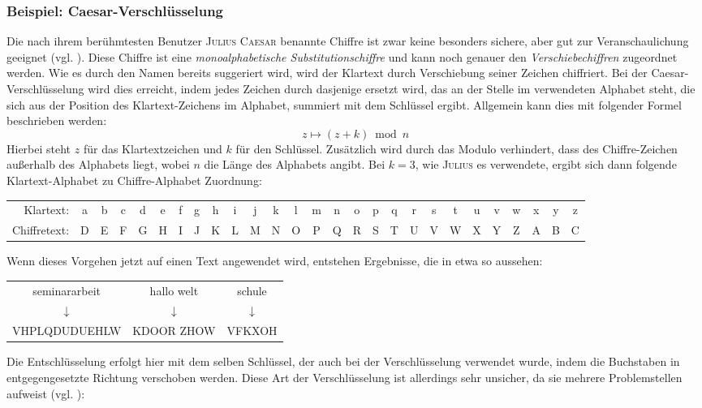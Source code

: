 \documentclass{scrarticle}
\newcommand{\person}[1]{\textsc{#1}}
\begin{document}
    \subsubsection*{Beispiel: Caesar-Verschlüsselung}
    Die nach ihrem berühmtesten Benutzer \person{Julius Caesar} benannte Chiffre ist zwar keine besonders sichere, aber  gut zur  Veranschaulichung geeignet (vgl. \cite[29]{ertel2003}). Diese Chiffre ist eine \emph{monoalphabetische Substitutionschiffre} und kann noch genauer den \emph{Verschiebechiffren} zugeordnet werden. Wie es durch den Namen bereits suggeriert wird, wird der Klartext durch Verschiebung seiner Zeichen chiffriert. Bei der Caesar-Verschlüsselung wird dies erreicht, indem jedes Zeichen durch dasjenige ersetzt wird, das an der Stelle im verwendeten Alphabet steht, die sich aus der Position des Klartext-Zeichens im Alphabet, summiert mit dem Schlüssel ergibt. Allgemein kann dies mit folgender Formel beschrieben werden:
    \begin{equation}
        z \mapsto (z+k) \bmod n
    \end{equation}
    Hierbei steht $z$ für das Klartextzeichen und $k$ für den Schlüssel. Zusätzlich wird durch das Modulo verhindert, dass des Chiffre-Zeichen außerhalb des Alphabets liegt, wobei $n$ die Länge des Alphabets angibt. Bei $k=3$, wie \person{Julius} es verwendete, ergibt sich dann folgende Klartext-Alphabet zu Chiffre-Alphabet Zuordnung:
    \begin{center}
        \begin{tabularx}{\textwidth}{r*{26}{C}}
            Klartext: &a&b&c&d&e&f&g&h&i&j&k&l&m&n&o&p&q&r&s&t&u&v&w&x&y&z\\
            Chiffretext: &D&E&F&G&H&I&J&K&L&M&N&O&P&Q&R&S&T&U&V&W&X&Y&Z&A&B&C
        \end{tabularx}
    \end{center}
    Wenn dieses Vorgehen jetzt auf einen Text angewendet wird, entstehen Ergebnisse, die in etwa so aussehen:
    \begin{center}
        \begin{tabular}{ccc}
            seminararbeit & hallo welt & schule \\
            $\downarrow$ & 	$\downarrow$ & 	$\downarrow$\\
            VHPLQDUDUEHLW & KDOOR ZHOW & VFKXOH
        \end{tabular}
    \end{center}
    Die Entschlüsselung erfolgt hier mit dem selben Schlüssel, der auch bei der Verschlüsselung verwendet wurde, indem die Buchstaben in entgegengesetzte Richtung verschoben werden. Diese Art der Verschlüsselung ist allerdings sehr unsicher, da sie mehrere Problemstellen aufweist (vgl. \cite[14]{watjen2008}):
\end{document}
